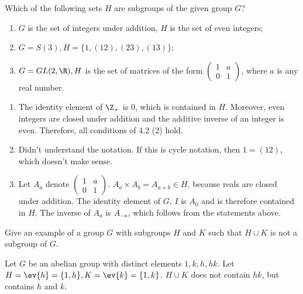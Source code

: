 \begin{exercise}
    Which of the following sets \(H\) are subgroups of the given group \(G\)?
    \begin{enumerate}
        \item \(G\) is the set of integers under addition, \(H\) is the set of even integers;
        \item \(G = S(3), H = \{1, (12), (23), (13)\}\);
        \item \(G = GL(2, \R), H\) is the set of matrices of the form \(\begin{pmatrix} 1 & a \\ 0 & 1 \end{pmatrix}\), where \(a\) is any real number.
    \end{enumerate}
\end{exercise}

\begin{solution}\itemfix
    \begin{enumerate}
        \item The identity element of \(\Z_{+}\) is \(0\), which is contained in \(H\). Moreover, even integers are closed under addition and the additive inverse of an integer is even. Therefore, all conditions of 4.2 (2) hold.
        \item \? Didn't understand the notation. If this is cycle notation, then \(1 = (12)\), which doesn't make sense.
        \item Let \(A_a\) denote \(\begin{pmatrix} 1 & a \\ 0 & 1 \end{pmatrix}\). \(A_a \times A_b = A_{a + b} \in H\), because reals are closed under addition. The identity element of \(G\), \(I\) is \(A_0\) and is therefore contained in \(H\). The inverse of \(A_a\) is \(A_{ - a}\), which follows from the statements above.
    \end{enumerate}
\end{solution}

\begin{exercise}
    Give an example of a group \(G\) with subgroups \(H\) and \(K\) such that \(H \cup K\) is not a subgroup of \(G\).
\end{exercise}
\begin{solution}
    Let \(G\) be an abelian group with distinct elements \(1, k, h, hk\). Let \(H = \ev{h} = \{1, h\}, K = \ev{k} = \{1, k\}\). \(H \cup K\) does not contain \(hk\), but contains \(h\) and \(k\).
\end{solution}

